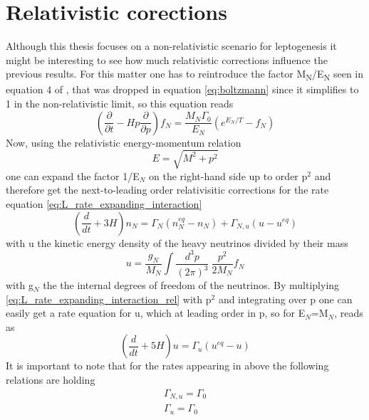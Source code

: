 \section{Relativistic corections}
Although this thesis focuses on a non-relativistic scenario for leptogenesis it might be interesting to see how much relativistic corrections influence the previous results. For this matter one has to reintroduce the factor M\textsubscript{N}/E\textsubscript{N} seen in equation 4 of \cite{Bodeker:2013qaa}, that was dropped in equation \ref{eq:boltzmann} since it simplifies to 1 in the non-relativistic limit, so this equation reads
\begin{equation}
	\left(\frac{\partial}{\partial t}-Hp\frac{\partial}{\partial p}\right)f_N=\frac{M_N\Gamma_0}{E_N}\left(e^{E_N/T}-f_N\right)
	\label{eq:boltzmann_2}
\end{equation}
Now, using the relativistic energy-momentum relation
\begin{equation}
	E=\sqrt{M^2+p^2}
	\label{eq:rel_energy_momentum}
\end{equation}
one can expand the factor 1/E$_N$ on the right-hand side up to order p$^2$ and therefore get the next-to-leading order relativisitic corrections for the rate equation \ref{eq:L_rate_expanding_interaction}
\begin{equation}
\left(\frac{d}{dt}+3H\right)n_N=\Gamma_N\left(n_N^{eq}-n_N\right)+\Gamma_{N,u}\left(u-u^{eq}\right)
\label{eq:L_rate_expanding_interaction_rel}
\end{equation}
with u the kinetic energy density of the heavy neutrinos divided by their mass
\begin{equation}
	u=\frac{g_N}{M_N}\int\frac{d^3p}{(2\pi)^3}\:\frac{p^2}{2M_N}f_N
	\label{eq:energy_density}
\end{equation}
with g$_N$ the the internal degrees of freedom of the neutrinos. \newline
By multiplying \ref{eq:L_rate_expanding_interaction_rel} with p$^2$ and integrating over p one can easily get a rate equation for u, which at leading order in p, so for E$_N$=M$_N$, reads as
\begin{equation}
	\left(\frac{d}{dt}+5H\right)u=\Gamma_u\left(u^{eq}-u\right)
	\label{eq:rate_u}
\end{equation}
It is important to note that for the rates appearing in above the following relations are holding
\begin{align}
	\Gamma_{N,u}=\Gamma_{0}
	\label{eq:Gamma_N,u}
	\\
	\Gamma_{u}=\Gamma_{0}
	\label{eq:Gamma_u}
\end{align}
